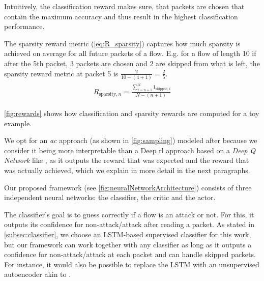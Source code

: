 \documentclass[conference]{IEEEtran}
\newcommand\note[2]{{\color{#1}#2}}
\begin{document}
Intuitively, the classification reward makes sure, that packets are chosen that contain the maximum accuracy and thus result in the highest classification performance.

The sparsity reward metric (\autoref{eq:R_sparsity}) captures how much sparsity is achieved on average for all future packets of a flow. E.g. for a flow of length 10 if after the 5th packet, 3 packets are chosen and 2 are skipped from what is left, the sparsity reward metric at packet 5 is $\frac{2}{10-(4+1)}=\frac{2}{5}$.
\begin{align}
\begin{split}
R_{\text{sparsity},n} = \frac{\sum_{i=n+1}^{N} 1_{\text{skipped},i}}{N-(n+1)}
\end{split}
\label{eq:R_sparsity}
\end{align}

\autoref{fig:rewards} shows how classification and sparsity rewards are computed for a toy example.

We opt for an \emph{\gls{ac}} approach (as shown in \autoref{fig:sampling}) modeled after \cite{mnih_asynchronous_2016} because we consider it being more interpretable than a Deep \gls{rl} approach based on a \textit{Deep Q Network} like \cite{mnih_playing_2013}, as it outputs the reward that was expected and the reward that was actually achieved, which we explain in more detail in the next paragraphs.

Our proposed framework (see \autoref{fig:neuralNetworkArchitecture}) consists of three independent neural networks: the classifier, the critic and the actor.

The classifier's goal is to guess correctly if a flow is an attack or not. For this, it outputs its confidence for non-attack/attack after reading a packet. As stated in \autoref{subsec:classifier}, we choose an LSTM-based supervised classifier for this work, but our framework can work together with any classifier as long as it outputs a confidence for non-attack/attack at each packet and can handle skipped packets. For instance, it would also be possible to replace the LSTM with an unsupervised autoencoder akin to \cite{mirsky_kitsune_2018}.
\end{document}
